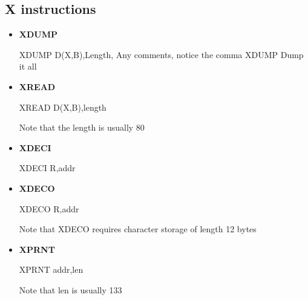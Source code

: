 \documentclass{report}
\begin{document}
    \bigbreak \noindent 
    \subsection{X instructions}
    \begin{itemize}
        \item \textbf{XDUMP}
            \bigbreak \noindent 
            \begin{cppcode}
            XDUMP   D(X,B),Length, Any comments, notice the comma
            XDUMP                Dump it all
            \end{cppcode}
        \item \textbf{XREAD}
            \bigbreak \noindent 
            \begin{cppcode}
            XREAD   D(X,B),length
            \end{cppcode}
            \bigbreak \noindent 
            Note that the length is usually 80
        \item \textbf{XDECI}
            \bigbreak \noindent 
            \begin{cppcode}
            XDECI   R,addr
            \end{cppcode}
        \item \textbf{XDECO}
            \bigbreak \noindent 
            \begin{cppcode}
            XDECO   R,addr
            \end{cppcode}
            \bigbreak \noindent 
            Note that XDECO requires character storage of length 12 bytes
        \item \textbf{XPRNT}
            \bigbreak \noindent 
            \begin{cppcode}
            XPRNT   addr,len
            \end{cppcode}
            \bigbreak \noindent 
            Note that len is usually 133

    \end{itemize}
    
\end{document}
